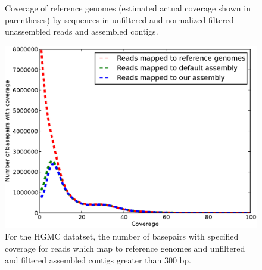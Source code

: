 \documentclass{pnastwo}
\begin{document}
\begin{figure}
\caption{Coverage of reference genomes (estimated actual coverage shown in parentheses) by sequences in unfiltered and normalized filtered unassembled reads and assembled contigs.}
\label{coverage1}
\end{figure}


\begin{figure}
\centerline{\includegraphics[width=.7\textwidth]{./figures/coverage.eps}}
\caption{For the HGMC datatset, the number of basepairs with specified coverage for reads which
  map to reference genomes and unfiltered and filtered assembled
  contigs greater than 300 bp.}
\label{coveragehmp}
\end{figure}
\end{document}
